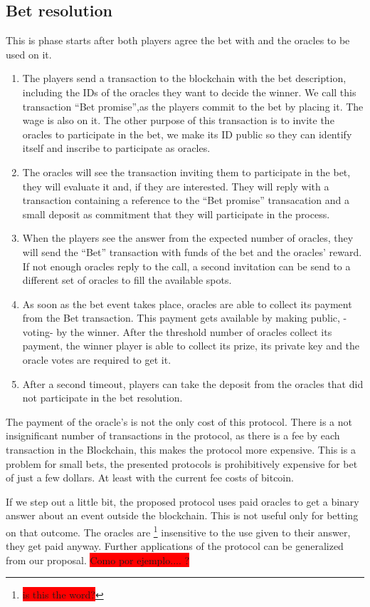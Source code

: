 \subsection{Bet resolution}
This is phase starts after both players agree the bet with and the oracles to
  be used on it.

\begin{enumerate}
  \item The players send a transaction to the blockchain with the bet
      description, including the IDs of the oracles they want to decide the
      winner.
    We call this transaction ``Bet promise'',as the players commit to the bet by
      placing it. The wage is also on it.
    The other purpose of this transaction is to invite the oracles to
      participate in the bet, we make its ID public so they can identify itself
      and inscribe to participate as oracles.
  \item The oracles will see the transaction inviting them to participate in the
      bet, they will evaluate it and, if they are interested.
    They will reply with a transaction containing a reference to the ``Bet
      promise'' transacation and a small deposit as commitment that they will
      participate in the process.
  \item When the players see the answer from the expected number of oracles,
  	  they will send the ``Bet'' transaction with funds of the bet and the
  	  oracles' reward.
  	If not enough oracles reply to the call, a second invitation can be send to
  	  a different set of oracles to fill the available spots.
  \item As soon as the bet event takes place, oracles are able to collect its
  	  payment from the Bet transaction. This payment gets available by making
  	  public, -voting- by the winner.
  	After the threshold number of oracles collect its payment, the winner player
  	  is able to collect its prize, its private key and the oracle votes are
  	  required to get it.
  \item After a second timeout, players can take the deposit from the oracles
  	  that did not participate in the bet resolution.
\end{enumerate}

The payment of the oracle's is not the only cost of this protocol.
There is a not insignificant number of transactions in the protocol, as there
  is a fee by each transaction in the Blockchain, this makes the protocol more
  expensive.
This is a problem for small bets, the presented protocols is prohibitively
  expensive for bet of just a few dollars. At least with the current fee costs
  of bitcoin.

If we step out a little bit, the proposed protocol uses paid oracles to get a
  binary answer about an event outside the blockchain. This is not useful only
  for betting on that outcome. The oracles are \footnote{\colorbox{red}{
  is this the word?}} insensitive to the use given to their answer, they get
  paid anyway. Further applications of the protocol can be generalized from our
  proposal. \colorbox{red}{Como por ejemplo.... ?}
